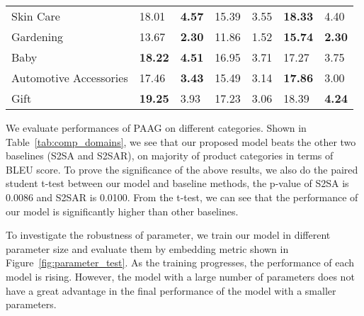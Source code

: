 \begin{table}[t]
\begin{tabular}{lllllll}
\multicolumn{1}{l|}{Skin Care}          & 18.01                   & \multicolumn{1}{l|}{\textbf{4.57}} & 15.39                   & \multicolumn{1}{l|}{3.55}   & \textbf{18.33}                   & 4.40   \\
\multicolumn{1}{l|}{Gardening} & 13.67                   & \multicolumn{1}{l|}{\textbf{2.30}}  & 11.86                   & \multicolumn{1}{l|}{1.52}  & \textbf{15.74}                   & \textbf{2.30}   \\
\multicolumn{1}{l|}{Baby}                   & \textbf{18.22}                   & \multicolumn{1}{l|}{\textbf{4.51}}  & 16.95                   & \multicolumn{1}{l|}{3.71}  & 17.27                   & 3.75 \\
\multicolumn{1}{l|}{Automotive Accessories}       & 17.46                   & \multicolumn{1}{l|}{\textbf{3.43}} & 15.49                    & \multicolumn{1}{l|}{3.14}  & \textbf{17.86}                   & 3.00  \\
\multicolumn{1}{l|}{Gift}                   & \textbf{19.25 }                  & \multicolumn{1}{l|}{3.93}  & 17.23                     & \multicolumn{1}{l|}{3.06}  & 18.39                   & \textbf{4.24} \\
\bottomrule
\end{tabular}
\end{table}

We evaluate performances of PAAG on different categories.
Shown in Table~\ref{tab:comp_domains}, we see that our proposed model beats the other two baselines (S2SA and S2SAR), on majority of product categories in terms of BLEU score.
To prove the significance of the above results, we also do the paired student t-test between our model and baseline methods, the p-value of S2SA is 0.0086 and S2SAR is 0.0100.
From the t-test, we can see that the performance of our model is significantly higher than other baselines.

To investigate the robustness of parameter, we train our model in different parameter size and evaluate them by embedding metric shown in Figure~\ref{fig:parameter_test}.
As the training progresses, the performance of each model is rising.
However, the model with a large number of parameters does not have a great advantage in the final performance of the model with a smaller parameters.

